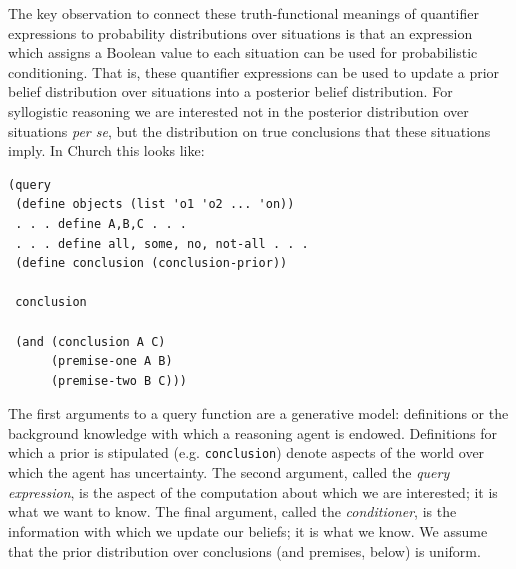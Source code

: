 \documentclass[10pt,letterpaper]{article}
\begin{document}
The key observation to connect these truth-functional meanings of quantifier expressions to probability distributions over situations is that an expression which assigns a Boolean value to each situation can be used for probabilistic conditioning. That is, these quantifier expressions can be used to update a prior belief distribution over situations into a posterior belief distribution. For syllogistic reasoning we are interested not in the posterior distribution over situations \emph{per se}, but the distribution on true conclusions that these situations imply. In Church this looks like:
\begin{lstlisting}
(query
 (define objects (list 'o1 'o2 ... 'on))
 . . . define A,B,C . . .
 . . . define all, some, no, not-all . . .
 (define conclusion (conclusion-prior))
 
 conclusion
 
 (and (conclusion A C) 
      (premise-one A B)
      (premise-two B C)))
\end{lstlisting}

The first arguments to a query function are a generative model: definitions or the background knowledge with which a reasoning agent is endowed. Definitions for which a prior is stipulated (e.g. \lstinline{conclusion}) denote aspects of the world over which the agent has uncertainty. The second argument, called the \emph{query expression}, is the aspect of the computation about which we are interested; it is what we want to know. The final argument, called the \emph{conditioner}, is the information with which we update our beliefs; it is what we know. We assume that the prior distribution over conclusions (and premises, below) is uniform.

%
%  
%  
\end{document}
